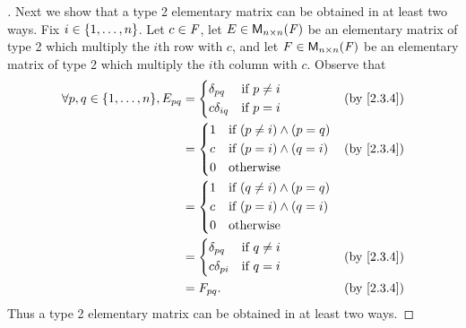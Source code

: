 \begin{proof}[]
  Next we show that a type 2 elementary matrix can be obtained in at least two ways.
  Fix \(i \in \left\lbrace1, \dots, n\right\rbrace\).
  Let \(c \in \mathit{F}\), let \(E \in \mathsf{M}_{{n} \times n}({\mathit{F}})\) be an elementary matrix of type 2 which multiply the \(i\)th row with \(c\), and let \(F \in \mathsf{M}_{{n} \times n}({\mathit{F}})\) be an elementary matrix of type 2 which multiply the \(i\)th column with \(c\).
  Observe that
  \begin{align*}
    \forall p, q \in \set{1, \dots, n}, E_{p q} & = \begin{dcases}
                                                      \delta_{p q}   & \text{if } p \neq i \\
                                                      c \delta_{i q} & \text{if } p = i
                                                    \end{dcases}    &  & \text{(by \cref{2.3.4})}                          \\
                                                & = \begin{dcases}
                                                      1 & \text{if } (p \neq i) \land (p = q) \\
                                                      c & \text{if } (p = i) \land (q = i)    \\
                                                      0 & \text{otherwise}
                                                    \end{dcases} &  & \text{(by \cref{2.3.4})}                             \\
                                                & = \begin{dcases}
                                                      1 & \text{if } (q \neq i) \land (p = q) \\
                                                      c & \text{if } (p = i) \land (q = i)    \\
                                                      0 & \text{otherwise}
                                                    \end{dcases}                                \\
                                                & = \begin{dcases}
                                                      \delta_{p q}   & \text{if } q \neq i \\
                                                      c \delta_{p i} & \text{if } q = i
                                                    \end{dcases}    &  & \text{(by \cref{2.3.4})}                          \\
                                                & = F_{p q}.                                 &  & \text{(by \cref{2.3.4})}
  \end{align*}
  Thus a type 2 elementary matrix can be obtained in at least two ways.


\end{proof}
